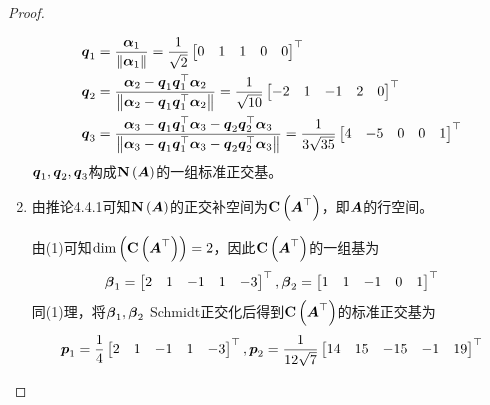 \begin{proof}
\begin{enumerate}
{              \begin{align*}
                  \boldsymbol{q}_1 & =\frac{\boldsymbol{\alpha}_1}{\left\Vert\boldsymbol{\alpha}_1\right\Vert}=\frac{1}{\sqrt2}\begin{bmatrix}0&1&1&0&0\end{bmatrix}^\top                                                                                                                      \\
                  \boldsymbol{q}_2 & =\frac{\boldsymbol{\alpha}_2-\boldsymbol{q}_1\boldsymbol{q}_1^\top\boldsymbol{\alpha}_2}{\left\Vert\boldsymbol{\alpha}_2-\boldsymbol{q}_1\boldsymbol{q}_1^\top\boldsymbol{\alpha}_2\right\Vert}=\frac{1}{\sqrt{10}}\begin{bmatrix}-2&1&-1&2&0\end{bmatrix}^\top                                                         \\
                  \boldsymbol{q}_3 & =\frac{\boldsymbol{\alpha}_3-\boldsymbol{q}_1\boldsymbol{q}_1^\top\boldsymbol{\alpha}_3-\boldsymbol{q}_2\boldsymbol{q}_2^\top\boldsymbol{\alpha}_3}{\left\Vert\boldsymbol{\alpha}_3-\boldsymbol{q}_1\boldsymbol{q}_1^\top\boldsymbol{\alpha}_3-\boldsymbol{q}_2\boldsymbol{q}_2^\top\boldsymbol{\alpha}_3\right\Vert}=\frac{1}{3\sqrt{35}}\begin{bmatrix}4&-5&0&0&1\end{bmatrix}^\top
              \end{align*}
              \(\boldsymbol{q}_1,\boldsymbol{q}_2,\boldsymbol{q}_3\)构成\(\boldsymbol{\mathrm{N}}\left( \boldsymbol{A} \right)\)的一组标准正交基。
              }
        \item {
              由推论4.4.1可知\(\boldsymbol{\mathrm{N}}\left( \boldsymbol{A} \right)\)的正交补空间为\(\boldsymbol{\mathrm{C}}\left( \boldsymbol{A}^\top \right)\)，即\(\boldsymbol{A}\)的行空间。

              由(1)可知\(\dim\left( \boldsymbol{\mathrm{C}}\left( \boldsymbol{A}^\top \right) \right)=2\)，因此\(\boldsymbol{\mathrm{C}}\left( \boldsymbol{A}^\top \right)\)的一组基为
              \begin{equation*}
                  \boldsymbol{\beta}_1=\begin{bmatrix}2&1&-1&1&-3\end{bmatrix}^\top,
                  \boldsymbol{\beta}_2=\begin{bmatrix}1&1&-1&0&1\end{bmatrix}^\top
              \end{equation*}
              同(1)理，将\(\boldsymbol{\beta}_1,\boldsymbol{\beta}_2\) Schmidt正交化后得到\(\boldsymbol{\mathrm{C}}\left( \boldsymbol{A}^\top \right)\)的标准正交基为
              \begin{equation*}
                  \boldsymbol{p}_1=\frac{1}{4}\begin{bmatrix}2&1&-1&1&-3\end{bmatrix}^\top,
                  \boldsymbol{p}_2=\frac{1}{12\sqrt{7}}\begin{bmatrix}14&15&-15&-1&19\end{bmatrix}^\top
              \end{equation*}
              }
    \end{enumerate}
\end{proof}

